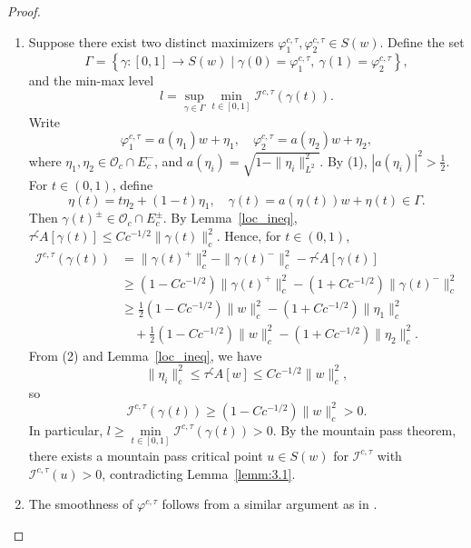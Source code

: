 \documentclass{amsart}
\theoremstyle{plain}
\theoremstyle{definition}
\theoremstyle{remark}
\numberwithin{equation}{section} \numberwithin{figure}{section}
\begin{document}
\begin{proof}
\begin{enumerate}
    \item[(3)] Suppose there exist two distinct maximizers \( \varphi_1^{c,\tau}, \varphi_2^{c,\tau} \in S(w) \). Define the set
    \[
    \Gamma= \left\{ \gamma : [0,1] \to S(w) \mid \gamma(0) = \varphi_1^{c,\tau},\ \gamma(1) = \varphi_2^{c,\tau} \right\},
    \]
    and the min-max level
    \[
    l = \sup_{\gamma \in \Gamma} \min_{t \in [0,1]} \mathcal{I}^{c,\tau}(\gamma(t)).
    \]
    Write
    \[
    \varphi_1^{c,\tau} = a(\eta_1) w + \eta_1, \quad \varphi_2^{c,\tau} = a(\eta_2) w + \eta_2,
    \]
    where \( \eta_1, \eta_2 \in \mathscr{O}_c \cap E_c^- \), and \( a(\eta_i) = \sqrt{1 - \|\eta_i\|_{L^2}^2} \). By (1), \( |a(\eta_i)|^2 > \frac{1}{2} \). For \( t \in (0,1) \), define
    \[
    \eta(t) = t \eta_2 + (1 - t) \eta_1, \quad \gamma(t) = a(\eta(t)) w + \eta(t) \in \Gamma.
    \]
    Then \( \gamma(t)^\pm \in \mathscr{O}_c \cap E_c^\pm \). By Lemma~\ref{loc_ineq}, \( \tau^{\zeta} A[\gamma(t)] \leq C c^{-1/2} \|\gamma(t)\|_c^2 \). Hence, for \( t \in (0,1) \),
    \[
    \begin{split}
      \mathcal{I}^{c,\tau}(\gamma(t))
      &= \|\gamma(t)^+\|_c^2 - \|\gamma(t)^-\|_c^2 - \tau^{\zeta} A[\gamma(t)] \\
      &\geq (1 - C c^{-1/2}) \|\gamma(t)^+\|_c^2 - (1 + C c^{-1/2}) \|\gamma(t)^-\|_c^2 \\
      &\geq \frac{1}{2}(1 - C c^{-1/2}) \|w\|_c^2 - (1 + C c^{-1/2}) \|\eta_1\|_c^2 \\
      &\quad + \frac{1}{2}(1 - C c^{-1/2}) \|w\|_c^2 - (1 + C c^{-1/2}) \|\eta_2\|_c^2.
    \end{split}
    \]
    From (2) and Lemma~\ref{loc_ineq}, we have
    \[
    \|\eta_i\|_c^2 \leq \tau^{\zeta} A[w] \leq C c^{-1/2} \|w\|_c^2,
    \]
    so
    \[
    \mathcal{I}^{c,\tau}(\gamma(t)) \geq (1 - C c^{-1/2}) \|w\|_c^2 > 0.
    \]
    In particular, \( l \geq \min\limits_{t \in [0,1]} \mathcal{I}^{c,\tau}(\gamma(t)) > 0 \). By the mountain pass theorem, there exists a mountain pass critical point \( u \in S(w) \) for \( \mathcal{I}^{c,\tau} \) with \( \mathcal{I}^{c,\tau}(u) > 0 \), contradicting Lemma~\ref{lemm:3.1}.
  
    \item[(4)] The smoothness of \( \varphi^{c,\tau} \) follows from a similar argument as in \cite[Proposition 3.6]{Nolasco}.
  \end{enumerate}
  \end{proof}
  
\end{document}

